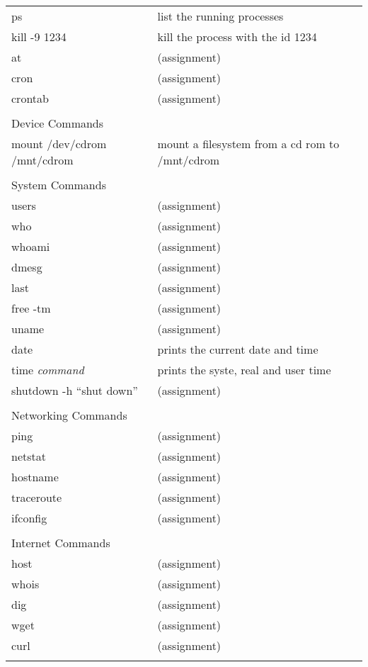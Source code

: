 \begin{center}
\begin{longtable}{|p{4cm}|p{8cm}|}
  ps & list the running processes \\
  kill -9 1234 & kill the process with the id 1234 \\
  at &  (assignment) \\
  cron &  (assignment) \\
  crontab &  (assignment) \\
  & \\

  \hline
  \multicolumn{2}{|l|}{\cellcolor{blue!15} Device Commands}\\
  \hline
  mount /dev/cdrom /mnt/cdrom & mount a filesystem from a cd rom to /mnt/cdrom\\
  & \\

  \hline
  \multicolumn{2}{|l|}{\cellcolor{blue!15} System Commands}\\
  \hline
  users &  (assignment) \\
  who &  (assignment) \\
  whoami &  (assignment) \\
  dmesg &  (assignment) \\
  last &  (assignment) \\
  free -tm &  (assignment) \\
  uname &  (assignment) \\
  date &  prints the current date and time \\
  time \textit{command} &  prints the syste, real and user time \\
  shutdown -h ``shut down'' & (assignment) \\
  & \\

  \hline
  \multicolumn{2}{|l|}{\cellcolor{blue!15} Networking Commands}\\
  \hline
  ping &  (assignment) \\
  netstat &  (assignment) \\
  hostname &  (assignment) \\
  traceroute &  (assignment) \\
  ifconfig &  (assignment) \\
  & \\

  \hline
  \multicolumn{2}{|l|}{\cellcolor{blue!15} Internet Commands}\\
  \hline
  host &  (assignment) \\
  whois &  (assignment) \\
  dig &  (assignment) \\
  wget &  (assignment) \\
  curl &  (assignment) \\
  & \\


\end{longtable}
\end{center}

